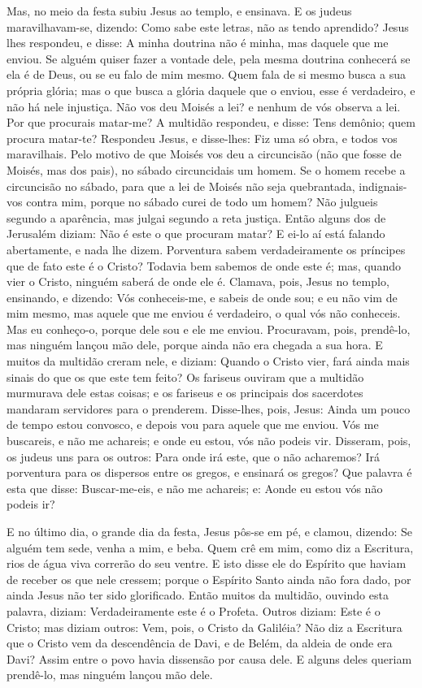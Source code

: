 Mas, no meio da festa subiu Jesus ao templo, e ensinava. E
os judeus maravilhavam-se, dizendo: Como sabe este letras, não as
tendo aprendido? Jesus lhes respondeu, e disse: A minha
doutrina não é minha, mas daquele que me enviou. Se alguém
quiser fazer a vontade dele, pela mesma doutrina conhecerá se ela é
de Deus, ou se eu falo de mim mesmo. Quem fala de si mesmo
busca a sua própria glória; mas o que busca a glória daquele que o
enviou, esse é verdadeiro, e não há nele injustiça. Não vos
deu Moisés a lei? e nenhum de vós observa a lei. Por que procurais
matar-me? A multidão respondeu, e disse: Tens demônio; quem
procura matar-te? Respondeu Jesus, e disse-lhes: Fiz uma só
obra, e todos vos maravilhais. Pelo motivo de que Moisés vos
deu a circuncisão (não que fosse de Moisés, mas dos pais), no sábado
circuncidais um homem. Se o homem recebe a circuncisão no
sábado, para que a lei de Moisés não seja quebrantada, indignais-vos
contra mim, porque no sábado curei de todo um homem? Não
julgueis segundo a aparência, mas julgai segundo a reta justiça.
Então alguns dos de Jerusalém diziam: Não é este o que
procuram matar? E ei-lo aí está falando abertamente, e nada
lhe dizem. Porventura sabem verdadeiramente os príncipes que de fato
este é o Cristo? Todavia bem sabemos de onde este é; mas,
quando vier o Cristo, ninguém saberá de onde ele é. Clamava,
pois, Jesus no templo, ensinando, e dizendo: Vós conheceis-me, e
sabeis de onde sou; e eu não vim de mim mesmo, mas aquele que me
enviou é verdadeiro, o qual vós não conheceis. Mas eu
conheço-o, porque dele sou e ele me enviou. Procuravam, pois,
prendê-lo, mas ninguém lançou mão dele, porque ainda não era chegada
a sua hora. E muitos da multidão creram nele, e diziam:
Quando o Cristo vier, fará ainda mais sinais do que os que este tem
feito? Os fariseus ouviram que a multidão murmurava dele
estas coisas; e os fariseus e os principais dos sacerdotes mandaram
servidores para o prenderem. Disse-lhes, pois, Jesus: Ainda
um pouco de tempo estou convosco, e depois vou para aquele que me
enviou. Vós me buscareis, e não me achareis; e onde eu estou,
vós não podeis vir. Disseram, pois, os judeus uns para os
outros: Para onde irá este, que o não acharemos? Irá porventura para
os dispersos entre os gregos, e ensinará os gregos? Que
palavra é esta que disse: Buscar-me-eis, e não me achareis; e: Aonde
eu estou vós não podeis ir?

E no último dia, o grande dia da festa, Jesus pôs-se em pé, e
clamou, dizendo: Se alguém tem sede, venha a mim, e beba.
Quem crê em mim, como diz a Escritura, rios de água viva
correrão do seu ventre. E isto disse ele do Espírito que
haviam de receber os que nele cressem; porque o Espírito Santo ainda
não fora dado, por ainda Jesus não ter sido glorificado.
Então muitos da multidão, ouvindo esta palavra, diziam:
Verdadeiramente este é o Profeta. Outros diziam: Este é o
Cristo; mas diziam outros: Vem, pois, o Cristo da Galiléia?
Não diz a Escritura que o Cristo vem da descendência de Davi,
e de Belém, da aldeia de onde era Davi? Assim entre o povo
havia dissensão por causa dele. E alguns deles queriam
prendê-lo, mas ninguém lançou mão dele.

